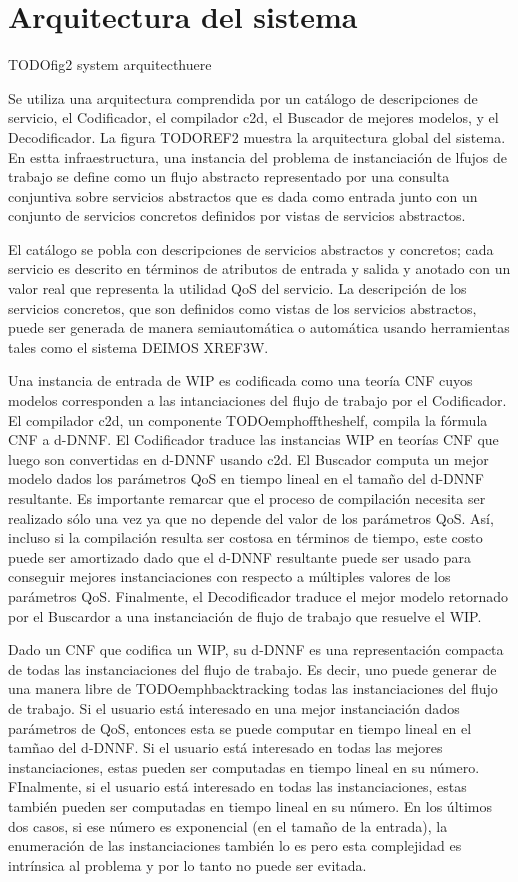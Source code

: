 \documentclass{article}
\begin{document}
\tableofcontents

\section{Arquitectura del sistema}

TODOfig2 system arquitecthuere

Se utiliza una arquitectura comprendida por un catálogo de descripciones de
servicio, el Codificador, el compilador c2d, el Buscador de mejores modelos, y
el Decodificador. La figura TODOREF2 muestra la arquitectura global del sistema.
En estta infraestructura, una instancia del problema de instanciación de lfujos
de trabajo se define como un flujo abstracto representado por una consulta
conjuntiva sobre servicios abstractos que es dada como entrada junto con un
conjunto de servicios concretos definidos por vistas de servicios abstractos.

El catálogo se pobla con descripciones de servicios abstractos y concretos; cada
servicio es descrito en términos de atributos de entrada y salida y anotado con
un valor real que representa la utilidad QoS del servicio. La descripción de los
servicios concretos, que son definidos como vistas de los servicios abstractos,
puede ser generada de manera semiautomática o automática usando herramientas
tales como el sistema DEIMOS XREF3W.

Una instancia de entrada de WIP es codificada como una teoría CNF cuyos modelos
corresponden a las intanciaciones del flujo de trabajo por el Codificador. El
compilador c2d, un componente TODOemphofftheshelf, compila la fórmula CNF a
d-DNNF. El Codificador traduce las instancias WIP en teorías CNF que luego son
convertidas en d-DNNF usando c2d. El Buscador computa un mejor modelo dados los
parámetros QoS en tiempo lineal en el tamaño del d-DNNF resultante. Es
importante remarcar que el proceso de compilación necesita ser realizado sólo
una vez ya que no depende del valor de los parámetros QoS. Así, incluso si la
compilación resulta ser costosa en términos de tiempo, este costo puede ser
amortizado dado que el d-DNNF resultante puede ser usado para conseguir mejores
instanciaciones con respecto a múltiples valores de los parámetros QoS.
Finalmente, el Decodificador traduce el mejor modelo retornado por el Buscardor
a una instanciación de flujo de trabajo que resuelve el WIP.

Dado un CNF que codifica un WIP, su d-DNNF es una representación compacta de
todas las instanciaciones del flujo de trabajo. Es decir, uno puede generar de
una manera libre de TODOemphbacktracking todas las instanciaciones del flujo de
trabajo. Si el usuario está interesado en una mejor instanciación dados
parámetros de QoS, entonces esta se puede computar en tiempo lineal en el tamñao
del d-DNNF. Si el usuario está interesado en todas las mejores instanciaciones,
estas pueden ser computadas en tiempo lineal en su número. FInalmente, si el
usuario está interesado en todas las instanciaciones, estas también pueden ser
computadas en tiempo lineal en su número. En los últimos dos casos, si ese
número es exponencial (en el tamaño de la entrada), la enumeración de las
instanciaciones también lo es pero esta complejidad es intrínsica al problema y
por lo tanto no puede ser evitada.
\end{document}
